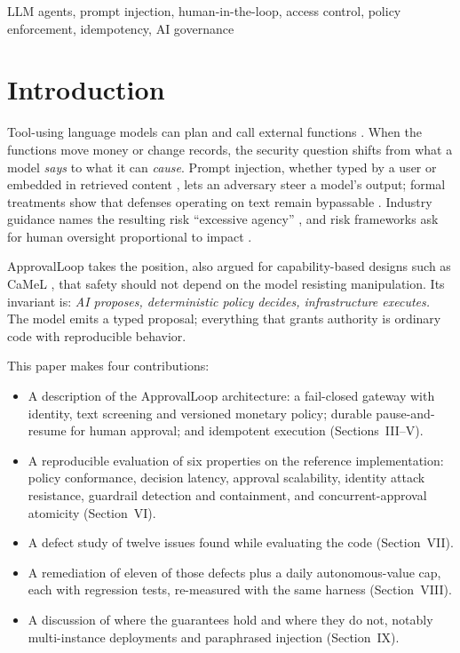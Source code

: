 \documentclass[conference]{IEEEtran}
\begin{document}
\begin{IEEEkeywords}
LLM agents, prompt injection, human-in-the-loop, access control, policy enforcement, idempotency, AI governance
\end{IEEEkeywords}

\section{Introduction}
Tool-using language models can plan and call external functions \cite{yao2023react,schick2023toolformer}. When the functions move money or change records, the security question shifts from what a model \emph{says} to what it can \emph{cause}. Prompt injection, whether typed by a user \cite{perez2022ignore} or embedded in retrieved content \cite{greshake2023indirect}, lets an adversary steer a model's output; formal treatments show that defenses operating on text remain bypassable \cite{liu2024formalizing}. Industry guidance names the resulting risk ``excessive agency'' \cite{owasp2023llm}, and risk frameworks ask for human oversight proportional to impact \cite{nist2023airmf}.

ApprovalLoop takes the position, also argued for capability-based designs such as CaMeL \cite{debenedetti2025camel}, that safety should not depend on the model resisting manipulation. Its invariant is: \emph{AI proposes, deterministic policy decides, infrastructure executes.} The model emits a typed proposal; everything that grants authority is ordinary code with reproducible behavior.

This paper makes four contributions:
\begin{itemize}
\item A description of the ApprovalLoop architecture: a fail-closed gateway with identity, text screening and versioned monetary policy; durable pause-and-resume for human approval; and idempotent execution (Sections~III--V).
\item A reproducible evaluation of six properties on the reference implementation: policy conformance, decision latency, approval scalability, identity attack resistance, guardrail detection and containment, and concurrent-approval atomicity (Section~VI).
\item A defect study of twelve issues found while evaluating the code (Section~VII).
\item A remediation of eleven of those defects plus a daily autonomous-value cap, each with regression tests, re-measured with the same harness (Section~VIII).
\item A discussion of where the guarantees hold and where they do not, notably multi-instance deployments and paraphrased injection (Section~IX).
\end{itemize}
\end{document}
